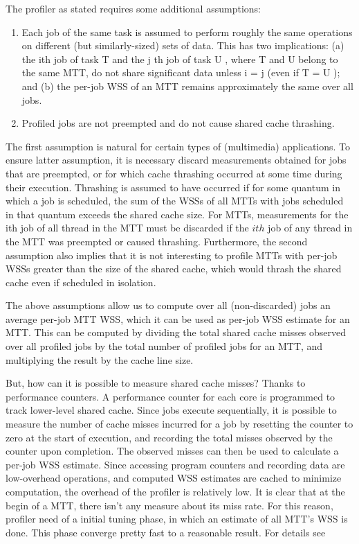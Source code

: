 The profiler as stated requires some additional assumptions:

\begin{enumerate}
\item Each job of the same task is assumed to perform roughly the same operations on different (but similarly-sized) sets of data.
      This has two implications: (a) the ith job of task T and the j th job of task U , where T and U belong to the same MTT, do not share
      significant data unless i = j (even if T = U ); and (b) the per-job WSS of an MTT remains approximately the same over all jobs.

\item Profiled jobs are not preempted and do not cause shared cache thrashing.

\end{enumerate}

The first assumption is natural for certain types of (multimedia) applications. To ensure latter assumption, it is necessary discard measurements obtained
for jobs that are preempted, or for which cache thrashing occurred at some time during their execution. 
Thrashing is assumed to have occurred if for some quantum in which a job is scheduled, the sum of the WSSs of all MTTs with jobs scheduled in that quantum 
exceeds the shared cache size. For MTTs, measurements for the ith job of all thread in the MTT must be discarded if the $ith$ job of any thread in the 
MTT was preempted or caused thrashing.
Furthermore, the second assumption also implies that it is not interesting to profile MTTs with per-job WSSs greater than the size of the
shared cache, which would thrash the shared cache even if scheduled in isolation.

The above assumptions allow us to compute over all (non-discarded) jobs an average per-job MTT WSS, which it can be used as per-job WSS estimate for
an MTT. This can be computed by dividing the total shared cache misses observed over all profiled jobs by the total number of profiled jobs for an MTT, 
and multiplying the result by the cache line size.

But, how can it is possible to measure shared cache misses? Thanks to performance counters.
A performance counter for each core is programmed to track lower-level shared cache. Since jobs execute sequentially, it is possible to measure the number
of cache misses incurred for a job by resetting the counter to zero at the start of execution, and recording the total misses observed by the counter
upon completion. The observed misses can then be used to calculate a per-job WSS estimate. Since accessing program counters and recording data
are low-overhead operations, and computed WSS estimates are cached to minimize computation, the overhead of the profiler is relatively low.
It is clear that at the begin of a MTT, there isn't any measure about its miss rate. For this reason, profiler need of a initial tuning phase, in which an 
estimate of all MTT's WSS is done. This phase converge pretty fast to a reasonable result. For details see %


